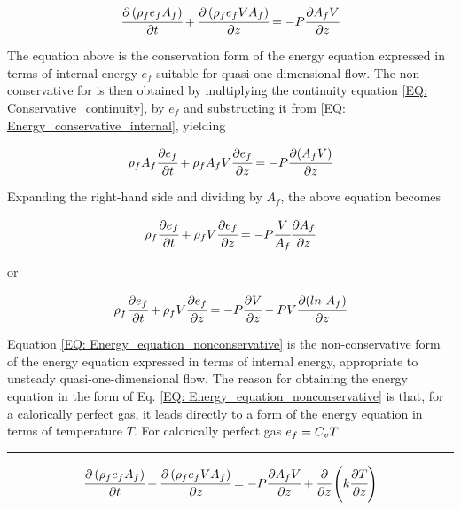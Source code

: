 \documentclass[../Article_Model_Parameters.tex]{subfiles}
\begin{document}
	{\footnotesize
		\begin{equation}
			\cfrac{\partial \left( \rho_f e_f A_f \right) }{\partial t} + \cfrac{\partial \left( \rho_f  e_f V A_f \right)}{\partial z} = -P \cfrac{\partial A_f V}{\partial z}
			\label{EQ: Energy_conservative_internal}
		\end{equation}
	}
	
	The equation above is the conservation form of the energy equation expressed in terms of internal energy $e_f$ suitable for quasi-one-dimensional flow. The non-conservative for is then obtained by multiplying the continuity equation \ref{EQ: Conservative_continuity}, by $e_f$ and substructing it from \ref{EQ: Energy_conservative_internal}, yielding 
	
	{\footnotesize
		\begin{equation}
			\rho_f A_f \cfrac{\partial e_f}{\partial t} + \rho_f A_f V \cfrac{\partial e_f}{\partial z} = - P \cfrac{\partial (A_f V) }{\partial z}
		\end{equation}
	}
	
	Expanding the right-hand side and dividing by $A_f$, the above equation becomes 
	
	{\footnotesize
		\begin{equation}
			\rho_f \cfrac{\partial e_f}{\partial t} + \rho_f V \cfrac{\partial e_f}{\partial z} = -P \cfrac{V}{A_f} \cfrac{\partial A_f}{\partial z}
		\end{equation}
	}

	or
	
	{\footnotesize
		\begin{equation}
			\rho_f \cfrac{\partial e_f}{\partial t} + \rho_f V \cfrac{\partial e_f}{\partial z} = -P \cfrac{\partial V}{\partial z} - P V \cfrac{\partial (ln~A_f)}{\partial z}
			\label{EQ: Energy_equation_nonconservative}
		\end{equation}
	}
	
	Equation \ref{EQ: Energy_equation_nonconservative} is the non-conservative form of the energy equation expressed in terms of internal energy, appropriate to unsteady quasi-one-dimensional flow. The reason for obtaining the energy equation in the form of Eq. \ref{EQ: Energy_equation_nonconservative} is that, for a calorically perfect gas, it leads directly to a form of the energy equation in terms of temperature $T$. For calorically perfect gas ${\footnotesize e_f=C_vT}$
	
	\hrule
	
	{\footnotesize
		\begin{equation}
			\cfrac{\partial \left( \rho_f e_f A_f \right) }{\partial t} + \cfrac{\partial \left( \rho_f  e_f V A_f \right)}{\partial z} = -P \cfrac{\partial A_f V}{\partial z} + \cfrac{\partial}{\partial z} \left( k \cfrac{\partial T}{\partial z} \right)
		\end{equation}
	}
	
	
	
	
	
	
	
	
	
	
	
	
	
	
	
\end{document}
